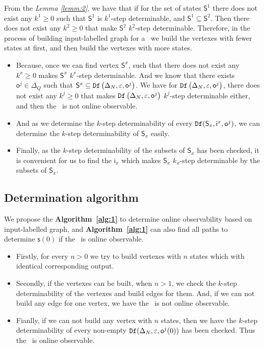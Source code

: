 From the {\em Lemma \ref{lemm:2}}, we have that if for the set of states $\mathsf{S}^1$ there does not exist any $k^{1}\ge 0$ such that $\mathsf{S}^{1}$ is $k^{1}$-step determinable, and $\mathsf{S}^{1}\subseteq \mathsf{S}^{2}$. Then there does not exist any $k^{2}\ge 0$ that make $\mathsf{S}^{2}$ $k^{2}$-step determinable. Therefore, in the process of building input-labelled graph for a \BCN\ we build the vertexes with fewer states at first, and then build the vertexes with more states.
\begin{itemize}
\item  Because, once we can find vertex $\mathsf{S}^x$, such that there does not exist any $k^{x}\ge0$ makes $\mathsf{S}^{x}$ $k^{x}$-step determinable. And we know that there exists $\mathsf{o}^{j}\in \Delta_Q$ such that $\mathsf{S}^{x}\subseteq {\tt Df}\left(\Delta_N,\varepsilon, \mathsf{o}^{j}\right)$. We have for ${\tt Df}\left(\Delta_N,\varepsilon, \mathsf{o}^{j}\right)$, there does not exist any $k^{j}\ge 0$ that makes  ${\tt Df}\left(\Delta_N,\varepsilon, \mathsf{o}^{j}\right)$ $k^{j}$-step determinable either, and then the \BCN\ is not online observable.
\item And as we determine the $k$-step determinability of every ${\tt Df}(\mathsf{S}_x,\mathsf{i}^{x},\mathsf{o}^{j})$, we can determine the $k$-step determinability of $\mathsf{S}_x$ easily.
\item  Finally, as the $k$-step determinability of the subsets of $\mathsf{S}_x$ has been checked, it is convenient for us to find the $\mathsf{i}_x$ which makes $\mathsf{S}_x$ $k_x$-step determinable by the subsets of $\mathsf{S}_x$.
 \end{itemize}
 \subsection{Determination algorithm}
 We propose the {\bf Algorithm~\ref{alg:1}} to determine online observability based on input-labelled graph, and {\bf Algorithm~\ref{alg:1}} can also find all paths to determine $\mathsf{s}(0)$ if the \BCN\ is online observable.

\begin{itemize}
\item  Firstly, for every $n>0$ we try to build vertexes with $n$ states which with identical corresponding output. 
\item Secondly, if the vertexes can  be built, when $n>1$, we check the $k$-step determinability of the vertexes and build edges for them. And, if we can not build any edge for one vertex, we have the \BCN\ is not online observable.
\item Fianlly, if we can not build any vertex with $n$ states, then we have the $k$-step determinability of every non-empty ${\tt Df}(\Delta_N,\varepsilon, \mathsf{o}^{j}(0))$ has been checked. Thus the \BCN\ is online observable.
 \end{itemize}

